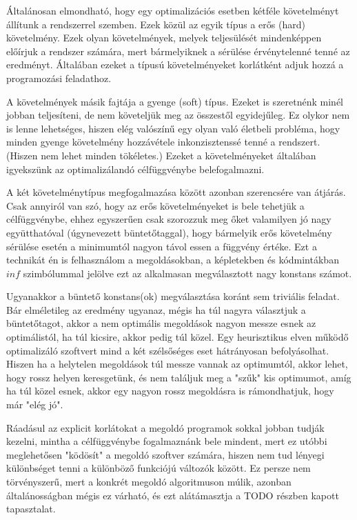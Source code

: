 Általánosan elmondható, hogy egy optimalizációs esetben kétféle követelményt állítunk a rendszerrel szemben. Ezek közül az egyik típus a erős (hard) követelmény. Ezek olyan követelmények, melyek teljesülését mindenképpen előírjuk a rendszer számára, mert bármelyiknek a sérülése érvénytelenné tenné az eredményt. Általában ezeket a típusú követelményeket korlátként adjuk hozzá a programozási feladathoz.

A követelmények másik fajtája a gyenge (soft) típus. Ezeket is szeretnénk minél jobban teljesíteni, de nem követeljük meg az összestől egyidejűleg. Ez olykor nem is lenne lehetséges, hiszen elég valószínű egy olyan való életbeli probléma, hogy minden gyenge követelmény hozzávétele inkonzisztenssé tenné a rendszert. (Hiszen nem lehet minden tökéletes.) Ezeket a követelményeket általában igyekszünk az optimalizálandó célfüggvénybe belefogalmazni.

A két követelménytípus megfogalmazása között azonban szerencsére van átjárás. Csak annyiról van szó, hogy az erős követelményeket is bele tehetjük a célfüggvénybe, ehhez egyszerűen csak szorozzuk meg őket valamilyen jó nagy együtthatóval (úgynevezett büntetőtaggal), hogy bármelyik erős követelmény sérülése esetén a minimumtól nagyon távol essen a függvény értéke.
Ezt a technikát én is felhasználom a megoldásokban, a képletekben és kódmintákban $inf$ szimbólummal jelölve ezt az alkalmasan megválasztott nagy konstans számot.

Ugyanakkor a büntető konstans(ok) megválasztása koránt sem triviális feladat. Bár elméletileg az eredmény ugyanaz, mégis ha túl nagyra választjuk a büntetőtagot, akkor a nem optimális megoldások nagyon messze esnek az optimálistól, ha túl kicsire, akkor pedig túl közel. Egy heurisztikus elven működő optimalizáló szoftvert mind a két szélsőséges eset hátrányosan befolyásolhat. Hiszen ha a helytelen megoldások túl messze vannak az optimumtól, akkor lehet, hogy rossz helyen keresgetünk, és nem találjuk meg a "szűk" kis optimumot, amíg ha túl közel esnek, akkor egy nagyon rossz megoldásra is rámondhatjuk, hogy már "elég jó".

Ráadásul az explicit korlátokat a megoldó programok sokkal jobban tudják kezelni, mintha a célfüggvénybe fogalmaznánk bele mindent, mert ez utóbbi meglehetősen "ködösít" a megoldó szoftver számára, hiszen nem tud lényegi különbséget tenni a különböző funkciójú változók között. Ez persze nem törvényszerű, mert a konkrét megoldó algoritmuson múlik, azonban általánosságban mégis ez várható, és ezt alátámasztja a TODO részben kapott tapasztalat.

